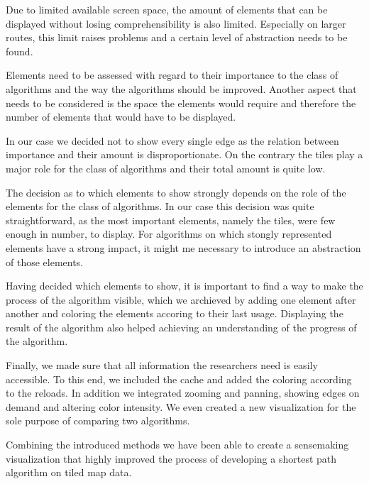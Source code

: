 \documentclass
[
    paper = a4,
    pagesize,
    12 pt,
    oneside,                       %
    open = right,
    DIV = calc,
    BCOR = 0 mm,                   %
    bibtotoc
]
{scrbook}
\begin{document}
Due to limited available screen space, the amount of elements that can be displayed without losing comprehensibility is also limited.
Especially on larger routes, this limit raises problems and a certain level of abstraction needs to be found.

Elements need to be assessed with regard to their importance to the class of algorithms and the way the algorithms should be improved.
Another aspect that needs to be considered is the space the elements would require and therefore the number of elements that would have to be displayed.

In our case we decided not to show every single edge as the relation between importance and their amount is disproportionate.
On the contrary the tiles play a major role for the class of algorithms and their total amount is quite low.

The decision as to which elements to show strongly depends on the role of the elements for the class of algorithms.
In our case this decision was quite straightforward, as the most important elements, namely the tiles, were few enough in number, to display.
For algorithms on which stongly represented elements have a strong impact, it might me necessary to introduce an abstraction of those elements.

Having decided which elements to show, it is important to find a way to make the process of the algorithm visible, which we archieved by adding one element after another and coloring the elements accoring to their last usage.
Displaying the result of the algorithm also helped achieving an understanding of the progress of the algorithm.

Finally, we made sure that all information the researchers need is easily accessible.
To this end, we included the cache and added the coloring according to the reloads.
In addition we integrated zooming and panning, showing edges on demand and altering color intensity.
We even created a new visualization for the sole purpose of comparing two algorithms.

Combining the introduced methods we have been able to create a sensemaking visualization that highly improved the process of developing a shortest path algorithm on tiled map data.




%
\end{document}
